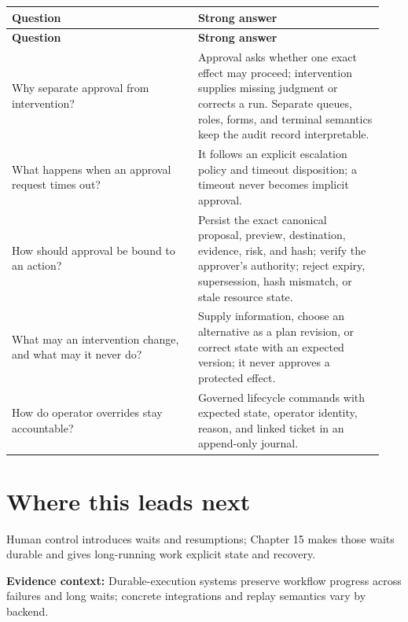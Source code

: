 \BookTableStart
\small
\begin{longtable}{@{}Y{0.4700\linewidth}Y{0.4700\linewidth}@{}}
\color{white}\bfseries \textbf{Question} & \color{white}\bfseries \textbf{Strong answer} \\
\endfirsthead
{}
\color{white}\bfseries \textbf{Question} & \color{white}\bfseries \textbf{Strong answer} \\
\endhead
Why separate approval from intervention? & Approval asks whether one exact effect may proceed; intervention supplies missing judgment or corrects a run. Separate queues, roles, forms, and terminal semantics keep the audit record interpretable. \\
What happens when an approval request times out? & It follows an explicit escalation policy and timeout disposition; a timeout never becomes implicit approval. \\
How should approval be bound to an action? & Persist the exact canonical proposal, preview, destination, evidence, risk, and hash; verify the approver's authority; reject expiry, supersession, hash mismatch, or stale resource state. \\
What may an intervention change, and what may it never do? & Supply information, choose an alternative as a plan revision, or correct state with an expected version; it never approves a protected effect. \\
How do operator overrides stay accountable? & Governed lifecycle commands with expected state, operator identity, reason, and linked ticket in an append-only journal. \\
\end{longtable}
\BookTableEnd

\section{Where this leads next}

Human control introduces waits and resumptions; Chapter 15 makes those waits durable and gives long-running work explicit state and recovery.\par



\begin{bookquote}

\textbf{Evidence context:} Durable-execution systems preserve workflow progress across failures and long waits; concrete integrations and replay semantics vary by backend. \textbf{}

\end{bookquote}

